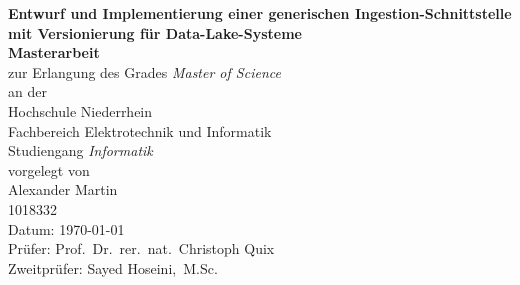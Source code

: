 \begin{titlepage}
  \begin{center}
    {\Large\bf Entwurf und Implementierung einer generischen Ingestion-Schnittstelle mit Versionierung für Data-Lake-Systeme}\\[2cm]

    {\bf Masterarbeit}\\
    zur Erlangung des Grades {\em Master of Science}\\[1cm]

    an der\\
    Hochschule Niederrhein\\
    Fachbereich Elektrotechnik und Informatik\\
    Studiengang {\em Informatik}\\[2cm]

    vorgelegt von\\
    Alexander Martin\\
    1018332\\[3cm]
    Datum: \today\\[2cm]

    Prüfer: Prof.~Dr.~rer.~nat.~Christoph Quix\\
    Zweitprüfer: Sayed Hoseini,~M.Sc.

  \end{center}
\end{titlepage}